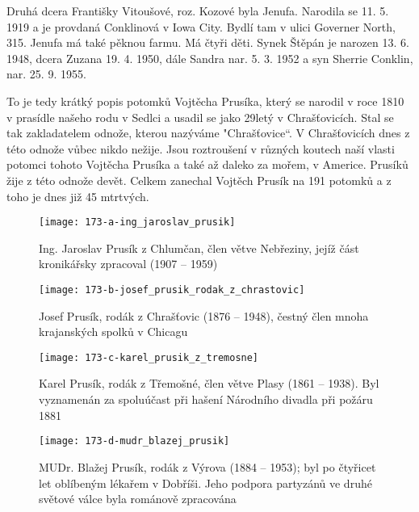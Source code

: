 \documentclass[../dejiny-rodu-prusiku.tex]{subfiles}
\begin{document}
Druhá dcera Františky Vitoušové, roz. Kozové byla Jenufa. Narodila se 11. 5. 1919 a je provdaná Conklinová v Iowa City. Bydlí tam v ulici Governer North, 315. Jenufa má také pěknou farmu. Má čtyři děti. Synek Štěpán je narozen 13. 6. 1948, dcera Zuzana 19. 4. 1950, dále Sandra nar. 5. 3. 1952 a syn Sherrie Conklin, nar. 25. 9. 1955.

To je tedy krátký popis potomků Vojtěcha Prusíka, který se narodil v roce 1810 v prasídle našeho rodu v Sedlci a usadil se jako 29letý v Chrašťovicích. Stal se tak zakladatelem odnože, kterou nazýváme "Chrašťovice“. V Chrašťovicích dnes z této odnože vůbec nikdo nežije. Jsou roztroušení v různých koutech naší vlasti potomci tohoto Vojtěcha Prusíka a také až daleko za mořem, v Americe.
Prusíků žije z této odnože devět. Celkem zanechal Vojtěch Prusík na 191  potomků a z toho je dnes již 45 mtrtvých.

\begin{figure}
\centering
\texttt{[image: 173-a-ing\_jaroslav\_prusik]}
\caption{Ing. Jaroslav Prusík z Chlumčan, člen větve Nebřeziny, jejíž část kronikářsky zpracoval (1907 – 1959)}
\label{fig:173-a-ing_jaroslav_prusik}
\end{figure}

\begin{figure}
\centering
\texttt{[image: 173-b-josef\_prusik\_rodak\_z\_chrastovic]}
\caption{Josef Prusík, rodák z Chrašťovic (1876 – 1948), čestný člen mnoha krajanských spolků v Chicagu}
\label{fig:173-b-josef_prusik_rodak_z_chrastovic}
\end{figure}

\begin{figure}
\centering
\texttt{[image: 173-c-karel\_prusik\_z\_tremosne]}
\caption{Karel Prusík, rodák z Třemošné, člen větve Plasy (1861 – 1938). Byl vyznamenán za spoluúčast při hašení Národního divadla při požáru 1881}
\label{fig:173-c-karel_prusik_z_tremosne}
\end{figure}

\begin{figure}
\centering
\texttt{[image: 173-d-mudr\_blazej\_prusik]}
\caption{MUDr. Blažej Prusík, rodák z Výrova (1884 – 1953); byl po čtyřicet let oblíbeným lékařem v Dobříši. Jeho podpora partyzánů ve druhé světové válce byla románově zpracována}
\label{fig:173-d-mudr_blazej_prusik}
\end{figure}
\end{document}
